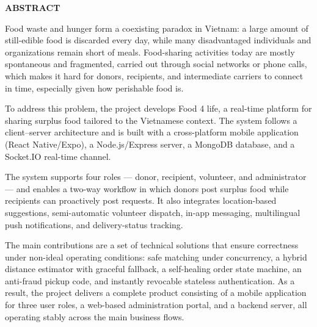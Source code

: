 \documentclass[../main.tex]{subfiles}
\begin{document}
\begin{center}
    \Large{\textbf{ABSTRACT}}\\
\end{center}
\vspace{1cm}
\indent Food waste and hunger form a coexisting paradox in Vietnam: a large amount of still-edible food is discarded every day, while many disadvantaged individuals and organizations remain short of meals. Food-sharing activities today are mostly spontaneous and fragmented, carried out through social networks or phone calls, which makes it hard for donors, recipients, and intermediate carriers to connect in time, especially given how perishable food is.

\indent To address this problem, the project develops Food 4 life, a real-time platform for sharing surplus food tailored to the Vietnamese context. The system follows a client--server architecture and is built with a cross-platform mobile application (React Native/Expo), a Node.js/Express server, a MongoDB database, and a Socket.IO real-time channel.

\indent The system supports four roles --- donor, recipient, volunteer, and administrator --- and enables a two-way workflow in which donors post surplus food while recipients can proactively post requests. It also integrates location-based suggestions, semi-automatic volunteer dispatch, in-app messaging, multilingual push notifications, and delivery-status tracking.

\indent The main contributions are a set of technical solutions that ensure correctness under non-ideal operating conditions: safe matching under concurrency, a hybrid distance estimator with graceful fallback, a self-healing order state machine, an anti-fraud pickup code, and instantly revocable stateless authentication. As a result, the project delivers a complete product consisting of a mobile application for three user roles, a web-based administration portal, and a backend server, all operating stably across the main business flows.
\end{document}
